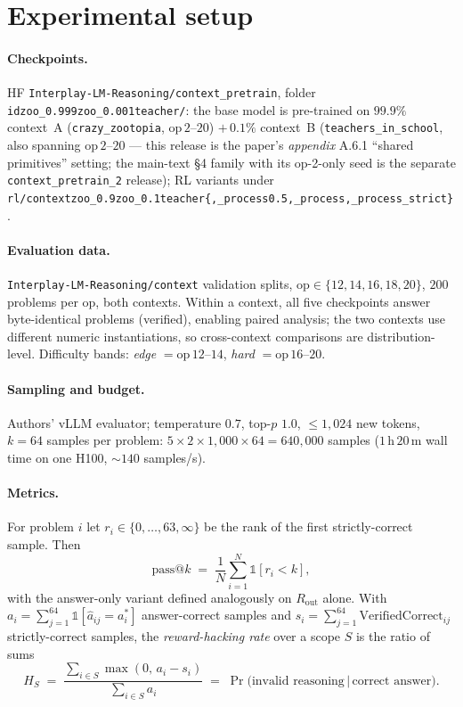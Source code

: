 \documentclass[11pt]{article}
\makeatletter
\newcommand{\passk}[1]{\ensuremath{\mathrm{pass}@#1}}
\newcommand{\Rout}{\ensuremath{R_{\mathrm{out}}}}
\newcommand{\ind}[1]{\ensuremath{\mathbb{1}\!\left[#1\right]}}
\makeatother
\begin{document}
\section{Experimental setup}

\paragraph{Checkpoints.} HF \texttt{Interplay-LM-Reasoning/context\_pretrain}, folder
\texttt{idzoo\_0.999zoo\_0.001teacher/}: the base model is pre-trained on $99.9\%$
context~A (\texttt{crazy\_zootopia}, $\mathrm{op}\,2$--$20$) $+\,0.1\%$ context~B
(\texttt{teachers\_in\_school}, also spanning $\mathrm{op}\,2$--$20$ --- this release is the
paper's \emph{appendix} A.6.1 ``shared primitives'' setting; the main-text \S4 family with its
op-2-only seed is the separate \texttt{context\_pretrain\_2} release); RL variants under
\texttt{rl/contextzoo\_0.9zoo\_0.1teacher\{,\_process0.5,\_process,\_process\_strict\}}.

\paragraph{Evaluation data.} \texttt{Interplay-LM-Reasoning/context} validation splits,
$\mathrm{op} \in \{12,14,16,18,20\}$, $200$ problems per op, both contexts. Within a
context, all five checkpoints answer byte-identical problems (verified), enabling
paired analysis; the two contexts use different numeric instantiations, so
cross-context comparisons are distribution-level. Difficulty bands:
\emph{edge} $= \mathrm{op}\,12$--$14$, \emph{hard} $= \mathrm{op}\,16$--$20$.

\paragraph{Sampling and budget.} Authors' vLLM evaluator; temperature $0.7$,
top-$p$ $1.0$, $\le 1{,}024$ new tokens, $k = 64$ samples per problem:
$5 \times 2 \times 1{,}000 \times 64 = 640{,}000$ samples
($1$\,h\,$20$\,m wall time on one H100, ${\sim}140$ samples/s).

\paragraph{Metrics.} For problem $i$ let $r_i \in \{0,\dots,63,\infty\}$ be the rank of
the first strictly-correct sample. Then
\begin{equation}
\passk{k} \;=\; \frac{1}{N} \sum_{i=1}^{N} \ind{r_i < k},
\label{eq:passk}
\end{equation}
with the answer-only variant defined analogously on $\Rout$ alone. With
$a_i = \sum_{j=1}^{64} \ind{\hat a_{ij} = a^{*}_i}$ answer-correct samples and
$s_i = \sum_{j=1}^{64} \mathrm{VerifiedCorrect}_{ij}$ strictly-correct samples, the
\emph{reward-hacking rate} over a scope $S$ is the ratio of sums
\begin{equation}
H_S \;=\; \frac{\sum_{i \in S} \max(0,\, a_i - s_i)}{\sum_{i \in S} a_i}
\;=\; \Pr\big(\text{invalid reasoning} \,\big|\, \text{correct answer}\big).
\label{eq:hack}
\end{equation}
\end{document}
